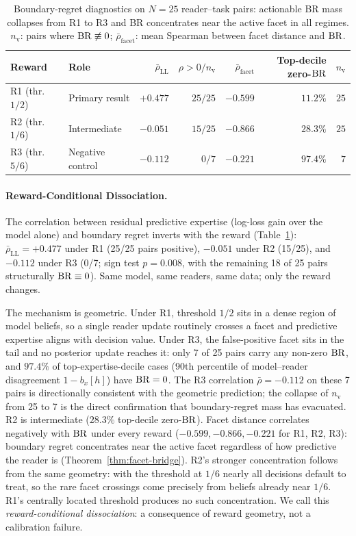 \begin{table}[htbp]
\centering
\caption{Boundary-regret diagnostics on $N=25$ reader--task pairs: actionable BR mass collapses from R1 to R3 and BR concentrates near the active facet in all regimes.
  $n_{\mathrm{v}}$: pairs where $\operatorname{BR}\not\equiv 0$; $\bar\rho_{\mathrm{facet}}$: mean Spearman between facet distance and $\operatorname{BR}$.
}
\label{tab:exp2}
\small
\begin{tabular}{@{}llrrrrr@{}}
\toprule
Reward & Role & $\bar\rho_{\mathrm{LL}}$ & $\rho{>}0/n_{\mathrm{v}}$ & $\bar\rho_{\mathrm{facet}}$ & Top-decile zero-$\operatorname{BR}$ & $n_{\mathrm{v}}$ \\
\midrule
R1 (thr.\ $1/2$) & Primary result    & $\mathbf{+0.477}$ & $25/25$ & $-0.599$ & $11.2\%$          & $25$ \\
R2 (thr.\ $1/6$) & Intermediate      & $-0.051$          & $15/25$ & $-0.866$ & $28.3\%$          & $25$ \\
R3 (thr.\ $5/6$) & Negative control  & $-0.112$          & $0/7$   & $-0.221$ & $\mathbf{97.4\%}$ & $7$  \\
\bottomrule
\end{tabular}
\end{table}

\paragraph{Reward-Conditional Dissociation.}
The correlation between residual predictive expertise (log-loss gain over the model alone) and boundary regret inverts with the reward (Table~\ref{tab:exp2}): $\bar\rho_{\mathrm{LL}}=+0.477$ under R1 (25/25 pairs positive), $-0.051$ under R2 (15/25), and $-0.112$ under R3 (0/7; sign test $p=0.008$, with the remaining 18 of 25 pairs structurally $\operatorname{BR}\equiv 0$).
Same model, same readers, same data; only the reward changes.

The mechanism is geometric.
Under R1, threshold $1/2$ sits in a dense region of model beliefs, so a single reader update routinely crosses a facet and predictive expertise aligns with decision value.
Under R3, the false-positive facet sits in the tail and no posterior update reaches it: only 7 of 25 pairs carry any non-zero $\operatorname{BR}$, and $97.4\%$ of top-expertise-decile cases (90th percentile of model--reader disagreement $1-b_x[h]$) have $\operatorname{BR}=0$.
The R3 correlation $\bar\rho=-0.112$ on these 7 pairs is directionally consistent with the geometric prediction; the collapse of $n_\mathrm{v}$ from 25 to 7 is the direct confirmation that boundary-regret mass has evacuated.
R2 is intermediate ($28.3\%$ top-decile zero-$\operatorname{BR}$).
Facet distance correlates negatively with $\operatorname{BR}$ under every reward ($-0.599, -0.866, -0.221$ for R1, R2, R3): boundary regret concentrates near the active facet regardless of how predictive the reader is (Theorem~\ref{thm:facet-bridge}).
R2's stronger concentration follows from the same geometry: with the threshold at $1/6$ nearly all decisions default to treat, so the rare facet crossings come precisely from beliefs already near $1/6$. R1's centrally located threshold produces no such concentration.
We call this \emph{reward-conditional dissociation}: a consequence of reward geometry, not a calibration failure.

